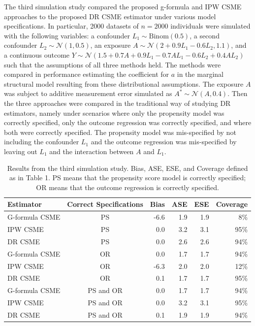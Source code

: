\documentclass[useAMS,usenatbib,referee]{biom}
\begin{document}
The third simulation study compared the proposed g-formula and IPW CSME approaches to the proposed DR CSME estimator under various model specifications. In particular, 2000 datasets of $n = 2000$ individuals were simulated with the following variables: a confounder $L_{1} \sim \text{Binom}(0.5)$, a second confounder $L_{2} \sim \mathcal{N}(1, 0.5)$, an exposure $A \sim \mathcal{N}(2 + 0.9L_{1} - 0.6L_{2}, 1.1)$, and a continuous outcome $Y \sim \mathcal{N}(1.5 + 0.7A + 0.9L_{1} - 0.7AL_{1} - 0.6L_{2} + 0.4AL_{2})$ such that the assumptions of all three methods held. The methods were compared in performance estimating the coefficient for $a$ in the marginal structural model resulting from these distributional assumptions. The exposure $A$ was subject to additive measurement error simulated as $A^{*} \sim \mathcal{N}(A, 0.4)$. Then the three approaches were compared in the traditional way of studying DR estimators, namely under scenarios where only the propensity model was correctly specified, only the outcome regression was correctly specified, and where both were correctly specified. The propensity model was mis-specified by not including the confounder $L_{1}$ and the outcome regression was mis-specified by leaving out $L_{1}$ and the interaction between $A$ and $L_{1}$.

\begin{table}[]
    \centering
    \caption{Results from the third simulation study. Bias, ASE, ESE, and Coverage defined as in Table 1. PS means that the propensity score model is correctly specified; OR means that the outcome regression is correctly specified.}
    \begin{tabular}{lcrrrr}
    \hline
         Estimator & Correct Specifications & Bias & ASE & ESE & Coverage \\
         \hline
G-formula CSME & PS & -6.6 & 1.9 & 1.9 & 8\% \\
IPW CSME & PS & 0.0 & 3.2 & 3.1 & 95\% \\
DR CSME & PS & 0.0 & 2.6 & 2.6 & 94\% \\[3pt]
G-formula CSME & OR & 0.0 & 1.7 & 1.7 & 94\% \\
IPW CSME & OR & -6.3 & 2.0 & 2.0 & 12\% \\
DR CSME & OR & 0.1 & 1.7 & 1.7 & 95\% \\[3pt]
G-formula CSME & PS and OR & 0.0 & 1.7 & 1.7 & 94\% \\
IPW CSME & PS and OR & 0.0 & 3.2 & 3.1 & 95\% \\
DR CSME & PS and OR & 0.1 & 1.9 & 1.9 & 94\% \\
         \hline
    \end{tabular}
    \label{tab:three}
\end{table}
\end{document}
